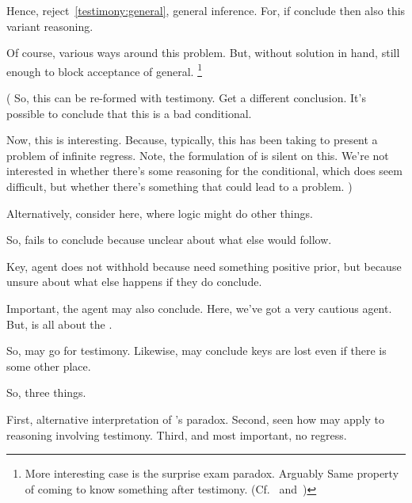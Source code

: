 \begin{note}
  Hence, reject~\ref{testimony:general}, general inference.
  For, if conclude then also this variant reasoning.

  Of course, various ways around this problem.
  But, without solution in hand, still enough to block acceptance of general.%
  \footnote{
    More interesting case is the surprise exam paradox.
    Arguably Same property of coming to know something after testimony.
    (Cf.~\textcite{Chow:1998vw} and~\textcite{Gerbrandy:2007vm})
  }


  (
  So, this can be re-formed with testimony.
  Get a different conclusion.
  It's possible to conclude that this is a bad conditional.

  Now, this is interesting.
  Because, typically, this has been taking to present a problem of infinite regress.
  Note, the formulation of \qzS{} is silent on this.
  We're not interested in whether there's some reasoning for the conditional, which does seem difficult, but whether there's something that could lead to a problem.
  )

  Alternatively, consider \citeauthor{Harman:1986ux} here, where logic might do other things.
\end{note}


\begin{note}
  So, fails to conclude because unclear about what else would follow.

  Key, agent does not withhold because need something positive prior, but because unsure about what else happens if they do conclude.
\end{note}

\begin{note}
  Important, the agent may also conclude.
  Here, we've got a very cautious agent.
  But, \qzS{} is all about the \agpe{}.

  So, may go for testimony.
  Likewise, may conclude keys are lost even if there is some other place.

  So, three things.

  First, alternative interpretation of \citeauthor{Carroll:1895uj}'s paradox.
  Second, seen how \qzS{} may apply to reasoning involving testimony.
  Third, and most important, no regress.
\end{note}

